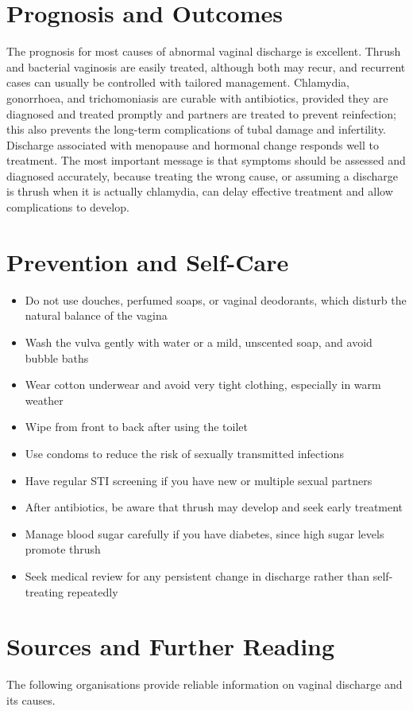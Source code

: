 \section*{Prognosis and Outcomes}
The prognosis for most causes of abnormal vaginal discharge is excellent. Thrush and bacterial vaginosis are easily treated, although both may recur, and recurrent cases can usually be controlled with tailored management. Chlamydia, gonorrhoea, and trichomoniasis are curable with antibiotics, provided they are diagnosed and treated promptly and partners are treated to prevent reinfection; this also prevents the long-term complications of tubal damage and infertility. Discharge associated with menopause and hormonal change responds well to treatment. The most important message is that symptoms should be assessed and diagnosed accurately, because treating the wrong cause, or assuming a discharge is thrush when it is actually chlamydia, can delay effective treatment and allow complications to develop.

\section*{Prevention and Self-Care}
\begin{itemize}
    \item Do not use douches, perfumed soaps, or vaginal deodorants, which disturb the natural balance of the vagina
    \item Wash the vulva gently with water or a mild, unscented soap, and avoid bubble baths
    \item Wear cotton underwear and avoid very tight clothing, especially in warm weather
    \item Wipe from front to back after using the toilet
    \item Use condoms to reduce the risk of sexually transmitted infections
    \item Have regular STI screening if you have new or multiple sexual partners
    \item After antibiotics, be aware that thrush may develop and seek early treatment
    \item Manage blood sugar carefully if you have diabetes, since high sugar levels promote thrush
    \item Seek medical review for any persistent change in discharge rather than self-treating repeatedly
\end{itemize}

\section*{Sources and Further Reading}
The following organisations provide reliable information on vaginal discharge and its causes.

